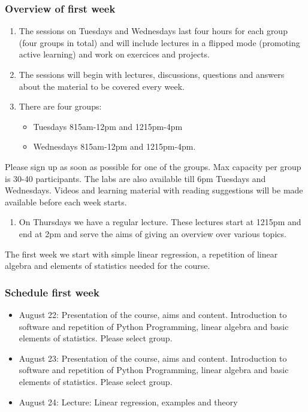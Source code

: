 \documentclass{beamer}
\begin{document}
\begin{frame}
\frametitle{Overview of first week}

\begin{enumerate}
\item The sessions on Tuesdays and Wednesdays last four hours for each group (four groups in total) and will include lectures in a flipped mode (promoting active learning) and work on exercices and projects.

\item The sessions will begin with lectures, discussions, questions and answers about the material to be covered every week.

\item There are four groups:
\begin{itemize}

  \item Tuesdays 815am-12pm and 1215pm-4pm

  \item Wednesdays 815am-12pm and 1215pm-4pm.
\end{itemize}

\noindent
\end{enumerate}

\noindent
Please sign up as soon as
possible for one of the groups. Max capacity per group is 30-40
participants. The labs are also available till 6pm Tuesdays and Wednesdays. Videos and learning material with reading suggestions will be made available before each week starts.

\begin{enumerate}
\item On Thursdays we have a regular lecture. These lectures start at 1215pm and end at 2pm and serve the aims of giving an overview over various topics. 
\end{enumerate}

\noindent
The first week we start with simple linear regression, a repetition of
linear algebra and elements of statistics needed for the course.
\end{frame}

\begin{frame}
\frametitle{Schedule first week}

\begin{block}{}
\begin{itemize}
  \item August 22: Presentation of the course, aims and content. Introduction to software and repetition of Python Programming, linear algebra and basic elements of statistics. Please select group.

  \item August 23: Presentation of the course, aims and content. Introduction to software and repetition of Python Programming, linear algebra and basic elements of statistics. Please select group.

  \item August 24: Lecture: Linear regression, examples and theory 
\end{itemize}

\noindent
\end{block}
\end{frame}
\end{document}
